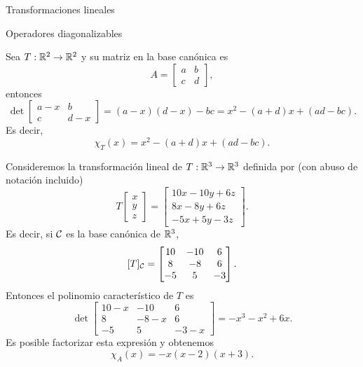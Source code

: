 \begin{chapter}{Transformaciones lineales}
\begin{section}{Operadores diagonalizables}
        \begin{ejemplo*}
            Sea $T: \mathbb R^2 \to \mathbb R^2$ y su matriz en la base canónica es
            \begin{equation*}
                A = \begin{bmatrix}
                    a&b\\c&d
                \end{bmatrix},
            \end{equation*}
        entonces
        \begin{equation*}
                 \det \begin{bmatrix}
                a-x & b \\ c &d-x
                \end{bmatrix} = 
                (a-x)(d-x) - bc = x^2 -(a+d)x + (ad -bc).
        \end{equation*}
        Es decir,
        $$
        \chi_T(x) = x^2 -(a+d)x + (ad -bc).
        $$ 
        \end{ejemplo*}

    
    
        
        \begin{ejemplo} \label{ej-autovectores}
            Consideremos la transformación lineal de $T:\mathbb R^3 \to \mathbb R^3$  definida por (con abuso de notación incluido)
            \begin{equation*}
                T
                \begin{bmatrix} x\\y\\z \end{bmatrix} =
                \begin{bmatrix} 10x-10y+6z\\8x -8y +6z \\-5x+5y-3z\end{bmatrix}.
            \end{equation*}
            Es decir,  si $\mathcal{C}$ es la base canónica de $\mathbb R^3$, 
            $$ 
            [T]_{\mathcal{C}}=\begin{bmatrix}10&-10&6\\8& -8& 6\\-5& 5& -3\end{bmatrix}.
            $$
            Entonces el  polinomio característico de $T$ es
            $$
            \det \begin{bmatrix}10-x&-10&6\\8& -8-x& 6\\-5& 5& -3-x\end{bmatrix} = -x^3  - x^2 + 6 x .
            $$
            Es posible factorizar esta expresión y obtenemos
            $$
            \chi_A(x) = -x (x-2)(x+3).
            $$
        \end{ejemplo}
        

\end{section}
\end{chapter}
